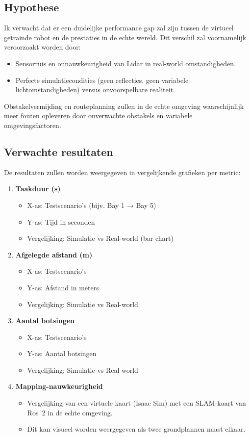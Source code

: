 \subsection{Hypothese}
Ik verwacht dat er een duidelijke performance gap zal zijn tussen de virtueel getrainde robot en de prestaties in de echte wereld. Dit verschil zal voornamelijk veroorzaakt worden door:
\begin{itemize}
    \item Sensorruis en onnauwkeurigheid van Lidar in real-world omstandigheden.
    \item Perfecte simulatiecondities (geen reflecties, geen variabele lichtomstandigheden) versus onvoorspelbare realiteit.
\end{itemize}
Obstakelvermijding en routeplanning zullen in de echte omgeving waarschijnlijk meer fouten opleveren door onverwachte obstakels en variabele omgevingsfactoren.

\subsection{Verwachte resultaten}

De resultaten zullen worden weergegeven in vergelijkende grafieken per metric:
\begin{enumerate}
    \item \textbf{Taakduur (s)} 
        \begin{itemize}
            \item X-as: Testscenario’s (bijv. Bay 1 → Bay 5)
            \item Y-as: Tijd in seconden
            \item Vergelijking: Simulatie vs Real-world (bar chart)
        \end{itemize}
    \item \textbf{Afgelegde afstand (m)}
        \begin{itemize}
            \item X-as: Testscenario's
            \item Y-as: Afstand in meters
            \item Vergelijking: Simulatie vs Real-world
        \end{itemize}
    \item \textbf{Aantal botsingen}
        \begin{itemize}
            \item X-as: Testscenario's
            \item Y-as: Aantal botsingen
            \item Vergelijking: Simulatie vs Real-world
        \end{itemize}
    \item \textbf{Mapping-nauwkeurigheid}
        \begin{itemize}
            \item Vergelijking van een virtuele kaart (Isaac Sim) met een SLAM-kaart van Ros~2 in de echte omgeving.
            \item Dit kan visueel worden weergegeven als twee grondplannen naast elkaar.
        \end{itemize}
\end{enumerate}
